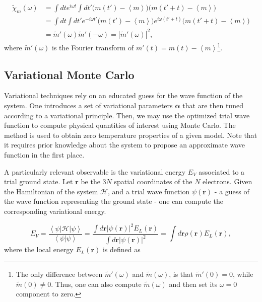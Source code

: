 \begin{equation}
\begin{split}
\tilde{\chi}_m ( \omega ) &= \int dt e^{i\omega t} \int dt' \bigg( m ( t' ) - \left\langle m \right\rangle \bigg) \bigg( m ( t' + t ) - \left\langle m \right\rangle \bigg) \\
&= \int dt \int dt' e^{-i\omega t'} \bigg( m ( t' ) - \left\langle m \right\rangle \bigg) e^{i\omega ( t' + t )} \bigg( m ( t' + t ) - \left\langle m \right\rangle \bigg) \\
&= \tilde{m}' (\omega) \tilde{m}' (- \omega) = | \tilde{m}' (\omega) |^2 ,
\end{split} 
\end{equation}
where $\tilde{m}' (\omega)$ is the Fourier transform of $m' (t) = m(t) - \left\langle m \right\rangle$\footnote{The only difference between $\tilde{m}' (\omega)$ and $\tilde{m} (\omega)$, is that $\tilde{m}' (0) = 0$, while $\tilde{m} (0) \neq 0$. Thus, one can also compute $\tilde{m} (\omega)$ and then set its $\omega = 0$ component to zero.}.

\subsection{Variational Monte Carlo}

Variational techniques rely on an educated guess for the wave function of the system.
One introduces a set of variational parameters $\bm \alpha$ that are then tuned according to a variational principle.
Then, we may use the optimized trial wave function to compute physical quantities of interest using Monte Carlo.
The method is used to obtain zero temperature properties of a given model.
Note that it requires prior knowledge about the system to propose an approximate wave function in the first place.

A particularly relevant observable is the variational energy $E_V$ associated to a trial ground state.
Let $\bm r$ be the $3N$ spatial coordinates of the $N$ electrons.
Given the Hamiltonian of the system $\mathcal{H}$, and a trial wave function $\psi (\bm r)$ - a guess of the wave function representing the ground state - one can compute the corresponding variational energy.

\begin{equation}\label{eq:variational_energy}
E_V = \frac{\left\langle \psi | \mathcal{H} | \psi \right \rangle}{\left\langle \psi | \psi \right \rangle} = \frac{ \int d\bm r |\psi (\bm r)|^2 E_L (\bm r)}{\int d\bm r | \psi (\bm r)|^2 } = \int d\bm r\rho (\bm r) E_L (\bm r) ,
\end{equation}
where the local energy $E_L (\bm r)$ is defined as

